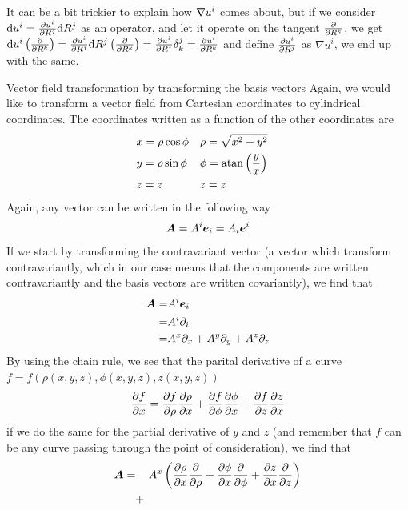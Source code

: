 \documentclass[a4paper, 12pt]{article}
\begin{document}
It can be a bit trickier to explain how $\nabla u^i$ comes about, but if we
consider $\text{d} u^i = \frac{\partial {u^i}}{\partial{R^j}} \text{d} R^j$ as an operator, and let it operate
on the tangent $\frac{\partial {}}{\partial{R^k}}$, we get $\text{d} u^i\left(\frac{\partial {}}{\partial{R^k}}\right) =
\frac{\partial {u^i}}{\partial{R^j}} \text{d} R^j\left(\frac{\partial {}}{\partial{R^k}}\right) = \frac{\partial {u^i}}{\partial{R^j}} \delta^j_k =
\frac{\partial {u^i}}{\partial{R^k}}$ and define $\frac{\partial {u^i}}{\partial{R^j}}$ as $\nabla u^i$, we end up with
the same.
%
\begin{example}{Vector field transformation by transforming the basis vectors}
 \label{ex:tbs}
 Again, we would like to transform a vector field from Cartesian coordinates to
 cylindrical coordinates. The coordinates written as a function of the other
 coordinates are
 \begin{align*}
  &x = \rho \cos\phi&
  &\rho = \sqrt{x^2+y^2}&
  \\
  &y = \rho \sin\phi&
  &\phi = \text{atan}\left(\frac{y}{x}\right)&
  \\
  &z=z&
  &z=z&
 \end{align*}
 Again, any vector can be written in the following way
 \begin{align*}
     \boldsymbol{A}=A^i\boldsymbol{e}_i=A_i\boldsymbol{e}^i
 \end{align*}
 If we start by transforming the contravariant vector (a vector which transform
 contravariantly, which in our case means that the components are written
 contravariantly and the basis vectors are  written covariantly), we find
 that
 \begin{align*}
     \boldsymbol{A}
     =& A^i\boldsymbol{e}_i\\
     =& A^i\partial_i\\
     =& A^x\partial_x + A^y\partial_y + A^z\partial_z
 \end{align*}
 By using the chain rule, we see that the parital derivative of a curve $f =
 f(\rho(x,y,z), \phi(x,y,z), z(x,y,z))$
 \begin{align*}
     \frac{\partial {f}}{\partial{x}} = \frac{\partial {f}}{\partial{\rho}}\frac{\partial {\rho}}{\partial{x}} +
                    \frac{\partial {f}}{\partial{\phi}}\frac{\partial {\phi}}{\partial{x}} +
                    \frac{\partial {f}}{\partial{z}}\frac{\partial {z}}{\partial{x}}
 \end{align*}
 if we do the same for the partial derivative of $y$ and $z$ (and remember
 that $f$ can be any curve passing through the point of consideration), we find
 that
 \begin{align*}
     \ve{A}
     =& \quad\, A^x\L(
            \parti{\rho}{x}\parti{}{\rho} +
            \parti{\phi}{x}\parti{}{\phi} +
            \parti{z}{x}\parti{}{z}
           \R)\\
      &+

\end{align*}
\end{example}
\end{document}
